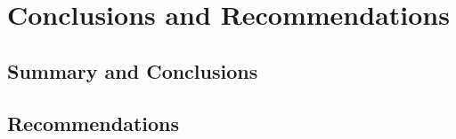\chapter{Conclusions and Recommendations}

	\section{Summary and Conclusions}
	
	\section{Recommendations}
